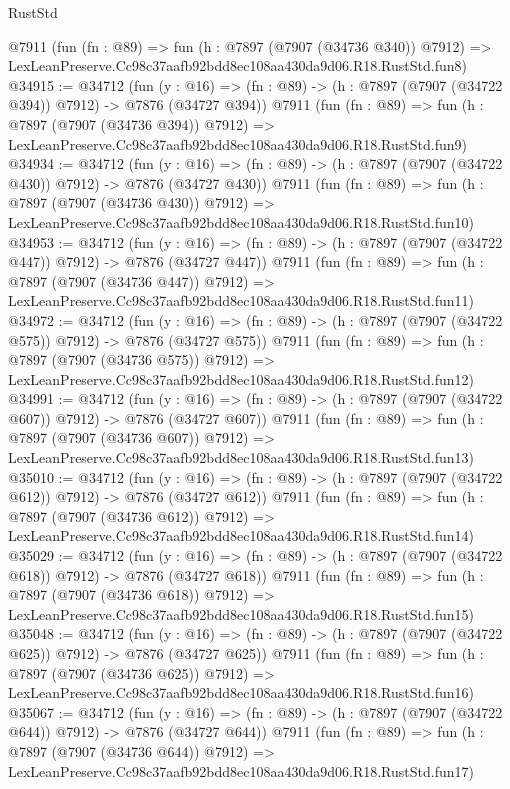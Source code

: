 \begin{lexlean}{RustStd}
\begin{coremodule}
    @7911
    (fun (fn : @89) =>
    fun (h : @7897 (@7907 (@34736 @340)) @7912) =>
    LexLeanPreserve.Cc98c37aafb92bdd8ec108aa430da9d06.R18.RustStd.fun8)
@34915 := @34712
    (fun (y : @16) => (fn : @89) -> (h : @7897 (@7907 (@34722 @394)) @7912) -> @7876 (@34727 @394))
    @7911
    (fun (fn : @89) =>
    fun (h : @7897 (@7907 (@34736 @394)) @7912) =>
    LexLeanPreserve.Cc98c37aafb92bdd8ec108aa430da9d06.R18.RustStd.fun9)
@34934 := @34712
    (fun (y : @16) => (fn : @89) -> (h : @7897 (@7907 (@34722 @430)) @7912) -> @7876 (@34727 @430))
    @7911
    (fun (fn : @89) =>
    fun (h : @7897 (@7907 (@34736 @430)) @7912) =>
    LexLeanPreserve.Cc98c37aafb92bdd8ec108aa430da9d06.R18.RustStd.fun10)
@34953 := @34712
    (fun (y : @16) => (fn : @89) -> (h : @7897 (@7907 (@34722 @447)) @7912) -> @7876 (@34727 @447))
    @7911
    (fun (fn : @89) =>
    fun (h : @7897 (@7907 (@34736 @447)) @7912) =>
    LexLeanPreserve.Cc98c37aafb92bdd8ec108aa430da9d06.R18.RustStd.fun11)
@34972 := @34712
    (fun (y : @16) => (fn : @89) -> (h : @7897 (@7907 (@34722 @575)) @7912) -> @7876 (@34727 @575))
    @7911
    (fun (fn : @89) =>
    fun (h : @7897 (@7907 (@34736 @575)) @7912) =>
    LexLeanPreserve.Cc98c37aafb92bdd8ec108aa430da9d06.R18.RustStd.fun12)
@34991 := @34712
    (fun (y : @16) => (fn : @89) -> (h : @7897 (@7907 (@34722 @607)) @7912) -> @7876 (@34727 @607))
    @7911
    (fun (fn : @89) =>
    fun (h : @7897 (@7907 (@34736 @607)) @7912) =>
    LexLeanPreserve.Cc98c37aafb92bdd8ec108aa430da9d06.R18.RustStd.fun13)
@35010 := @34712
    (fun (y : @16) => (fn : @89) -> (h : @7897 (@7907 (@34722 @612)) @7912) -> @7876 (@34727 @612))
    @7911
    (fun (fn : @89) =>
    fun (h : @7897 (@7907 (@34736 @612)) @7912) =>
    LexLeanPreserve.Cc98c37aafb92bdd8ec108aa430da9d06.R18.RustStd.fun14)
@35029 := @34712
    (fun (y : @16) => (fn : @89) -> (h : @7897 (@7907 (@34722 @618)) @7912) -> @7876 (@34727 @618))
    @7911
    (fun (fn : @89) =>
    fun (h : @7897 (@7907 (@34736 @618)) @7912) =>
    LexLeanPreserve.Cc98c37aafb92bdd8ec108aa430da9d06.R18.RustStd.fun15)
@35048 := @34712
    (fun (y : @16) => (fn : @89) -> (h : @7897 (@7907 (@34722 @625)) @7912) -> @7876 (@34727 @625))
    @7911
    (fun (fn : @89) =>
    fun (h : @7897 (@7907 (@34736 @625)) @7912) =>
    LexLeanPreserve.Cc98c37aafb92bdd8ec108aa430da9d06.R18.RustStd.fun16)
@35067 := @34712
    (fun (y : @16) => (fn : @89) -> (h : @7897 (@7907 (@34722 @644)) @7912) -> @7876 (@34727 @644))
    @7911
    (fun (fn : @89) =>
    fun (h : @7897 (@7907 (@34736 @644)) @7912) =>
    LexLeanPreserve.Cc98c37aafb92bdd8ec108aa430da9d06.R18.RustStd.fun17)

\end{coremodule}
\end{lexlean}
